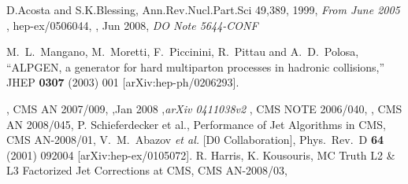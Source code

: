 


%

\begin{thebibliography}{9}
   {D.Acosta and S.K.Blessing, Ann.Rev.Nucl.Part.Sci 49,389},
    1999,
    {\em From June 2005}
  , hep-ex/0506044,
  , Jun 2008,
  {\em DO Note 5644-CONF}


    M.~L.~Mangano, M.~Moretti, F.~Piccinini, R.~Pittau and A.~D.~Polosa,
    ``ALPGEN, a generator for hard multiparton processes in hadronic collisions,''
    JHEP {\bf 0307} (2003) 001
    [arXiv:hep-ph/0206293].

  , CMS AN 2007/009,
  ,Jan 2008 ,{\em arXiv 0411038v2}
  , CMS NOTE 2006/040,
  , CMS AN 2008/045,
   {P. Schieferdecker et al., Performance of Jet Algorithms in CMS}, CMS AN-2008/01,
    V.~M.~Abazov {\it et al.}  [D0 Collaboration], 	 
    Phys.\ Rev.\  D {\bf 64} (2001) 092004 	 
    [arXiv:hep-ex/0105072]. 	 
   {R. Harris, K. Kousouris, MC Truth L2 \& L3 Factorized Jet Corrections at CMS}, CMS AN-2008/03,
 
 
 \end{thebibliography}
 

%
